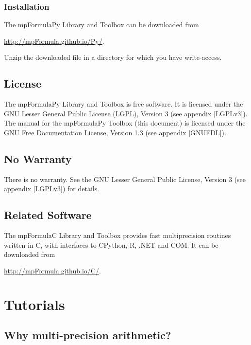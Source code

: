 \subsection{Installation}
\label{Installation}
The mpFormulaPy Library and Toolbox can be downloaded from 

\vpara
\href{http://mpFormula.github.io/Py/}{http://mpFormula.github.io/Py/}. 

\vpara
Unzip the downloaded file in a directory for which you have write-access.





\section{License}
\label{mpFormulaLicense}

The mpFormulaPy Library and Toolbox is free software. It is licensed under the GNU Lesser General Public License (LGPL), Version 3 (see appendix \ref{LGPLv3}).
The manual for the mpFormulaPy Toolbox (this document) is licensed under the GNU Free Documentation License, Version 1.3 (see appendix \ref{GNUFDL}).




\section{No Warranty}
\label{No Warranty} 

There is no warranty. See the GNU  Lesser General Public License, Version 3 (see appendix \ref{LGPLv3}) for details.


\section{Related Software}

The mpFormulaC  Library and Toolbox provides fast multiprecision routines written in C, with interfaces to CPython, R, .NET and COM. It can be downloaded from 

\href{http://mpFormula.github.io/C/}{http://mpFormula.github.io/C/}. 








\chapter{Tutorials}
\label{Tutorials} 

\section{Why multi-precision arithmetic?}
\label{Why multiprecision arithmetic}

